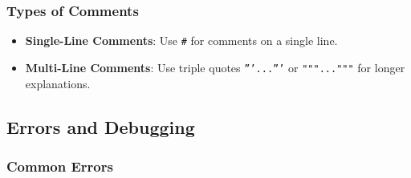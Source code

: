 \subsubsection{Types of Comments}
\begin{itemize}
    \item \textbf{Single-Line Comments}: Use \texttt{\#} for comments on a single line.
    \item \textbf{Multi-Line Comments}: Use triple quotes \texttt{'''...'''} or \texttt{"""..."""} for longer explanations.
\end{itemize}

\subsection{Errors and Debugging}
\subsubsection{Common Errors}
